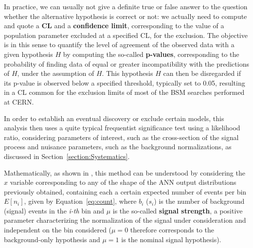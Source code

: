 \documentclass[a4paper, 10pt, openright]{report}
\begin{document}
In practice, we can usually not give a definite true or false answer to the question whether the alternative hypothesis is correct or not: we actually need to compute and quote a \textbf{\ac{CL}} and a \textbf{confidence limit}, corresponding to the value of a population parameter excluded at a specified \ac{CL}, for the exclusion. The objective is in this sense to quantify the level of agreement of the observed data with a given hypothesis $H$ by computing the so-called \textbf{p-values}, corresponding to the probability of finding data of equal or greater incompatibility with the predictions of $H$, under the assumption of $H$. This hypothesis $H$ can then be disregarded if its p-value is observed below a specified threshold, typically set to 0.05, resulting in a \ac{CL} common for the exclusion limits of most of the \ac{BSM} searches performed at \ac{CERN}.

%
%
%

In order to establish an eventual discovery or exclude certain models, this analysis then uses a quite typical frequentist significance test using a likelihood ratio, considering parameters of interest, such as the cross-section of the signal process and nuisance parameters, such as the background normalizations, as discussed in Section~\ref{section:Systematics}. 

Mathematically, as shown in \cite{asymptotic}, this method can be understood by considering the $x$ variable corresponding to any of the shape of the \ac{ANN} output distributions previously obtained, containing each a certain expected number of events per bin $E[n_i]$, given by Equation~\ref{eq:count}, where $b_i$ ($s_i$) is the number of background (signal) events in the \textit{i-th} bin and $\mu$ is the so-called \textbf{signal strength}, a positive parameter characterizing the normalization of the signal under consideration and independent on the bin considered ($\mu = 0$ therefore corresponds to the background-only hypothesis and $\mu = 1$ is the nominal signal hypothesis).
\end{document}

